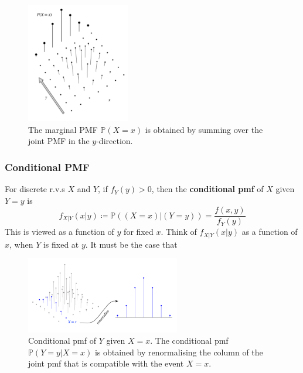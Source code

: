 \documentclass{article}
\begin{document}
\begin{figure}[H]
    \centering
    \includegraphics[width=0.4\textwidth]{Images/discretemarginalpmf.png}
    \caption{The marginal PMF $ \mathbb{P}(X = x)$ is obtained by summing over the joint PMF in the $y$-direction.}
    \label{fig:}
\end{figure} 


\subsubsection{Conditional PMF}

\begin{definition}
    For discrete r.v.s $X$ and $Y$, if $f_Y(y) > 0$, then the \textbf{conditional pmf} of $X$ given $Y = y$ is \begin{equation}
        f_{X | Y} (x|y) \coloneq \mathbb{P}((X = x) | (Y = y)) = \frac{f(x, y)}{f_Y (y)}
    \end{equation} This is viewed as a function of $y$ for fixed $x$. Think of $f_{X | Y}(x|y)$ as a function of $x$, when $Y$ is fixed at $y$. It must be the case that 
\end{definition}

\begin{figure}[H]
    \centering
    \includegraphics[width=0.6\textwidth]{Images/discreteconditionalpmf.png}
    \caption{Conditional pmf of $Y$ given $X = x$. The conditional pmf $ \mathbb{P}(Y = y | X = x)$ is obtained by renormalising the column of the joint pmf that is compatible with the event $X = x$. }
    \label{fig:}
\end{figure} 
\end{document}
